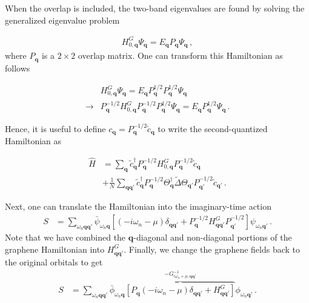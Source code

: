 \documentclass[aps, prb, superscriptaddress, preprint, floatfix]{revtex4-1}
\begin{document}
When the overlap is included, the two-band eigenvalues are found by solving the generalized eigenvalue problem

%
\begin{align}
	H^G_{0,\mathbf{q}}\Psi_\mathbf{q} = E_\mathbf{q}P_\mathbf{q} \Psi_\mathbf{q}\,,
\end{align}
%
where $P_\mathbf{q}$ is a $2\times 2$ overlap matrix. One can transform this Hamiltonian as follows

%
\begin{align}
	&H^G_{0,\mathbf{q}}\Psi_\mathbf{q} = E_\mathbf{q}P^{1/2}_\mathbf{q} P^{1/2}_\mathbf{q} \Psi_\mathbf{q}
	\nonumber
	\\
	\rightarrow &P^{-1/2}_\mathbf{q}H^G_{0,\mathbf{q}}P^{-1/2}_\mathbf{q}P^{1/2}_\mathbf{q}\Psi_\mathbf{q} = E_\mathbf{q} P^{1/2}_\mathbf{q} \Psi_\mathbf{q}\,.
\end{align}
%

Hence, it is useful to define $c_\mathbf{q} = P_\mathbf{q}^{-1/2}\tilde{c}_\mathbf{q}$ to write the second-quantized Hamiltonian as

%
\begin{align}
    \hat{H} &= \sum_{\mathbf{q}} \tilde{c}_\mathbf{q}^\dagger P_\mathbf{q}^{-1/2}
    H_{0,\mathbf{q}}^G 
    P_\mathbf{q}^{-1/2}\tilde{c}_\mathbf{q}
    \nonumber
    \\
    &+
    \frac{1}{N}\sum_{\mathbf{qq}'} \tilde{c}_\mathbf{q}^\dagger P_\mathbf{q}^{-1/2} \Theta_{\mathbf{q}}^\dagger \tilde{\Delta} \Theta_{\mathbf{q}'}P_{\mathbf{q}'}^{-1/2}\tilde{c}_{\mathbf{q}'}
    \,.
    \label{eqn:H_QFT_2}
\end{align}
%

Next, one can translate the Hamiltonian into the imaginary-time action
%
\begin{align}
    S &= \sum_{\omega_n\mathbf{qq}'} \bar\psi_{\omega_n\mathbf{q}}
    \left[\left(-i\omega_n-\mu\right) \delta_{\mathbf{qq}'}
    + 
    P_\mathbf{q}^{-1/2}
    H^G_{\mathbf{qq}'} 
    P_{\mathbf{q}'}^{-1/2}
    \right]
    \psi_{\omega_n\mathbf{q}'}\,.
    \label{eqn:S}
\end{align}
%
Note that we have combined the $\mathbf{q}$-diagonal and non-diagonal portions of the graphene Hamiltonian into $ H^G_{\mathbf{qq}'}$. Finally, we change the graphene fields back to the original orbitals to get
%
\begin{align}
    S &= \sum_{\omega_n\mathbf{qq}'} \bar\phi_{\omega_n\mathbf{q}}
    \overbrace{
    \left[P_\mathbf{q}\left(-i\omega_n-\mu\right) \delta_{\mathbf{qq}'}
    + 
    H^G_{\mathbf{qq}'} \right]}^{-G^{-1}_{i\omega_n + \mu, \mathbf{qq}'}}
    \phi_{\omega_n\mathbf{q}'}\,.
    \label{eqn:S_2}
\end{align}
%
\end{document}
